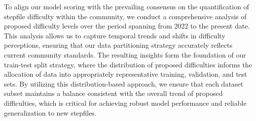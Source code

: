 \vspace{2mm}


To align our model scoring with the prevailing consensus on the quantification of stepfile difficulty within the community, we conduct a comprehensive analysis of proposed difficulty levels over the period spanning from 2022 to the present date. This analysis allows us to capture temporal trends and shifts in difficulty perceptions, ensuring that our data partitioning strategy accurately reflects current community standards. The resulting insights form the foundation of our train-test split strategy, where the distribution of proposed difficulties informs the allocation of data into appropriately representative training, validation, and test sets. By utilizing this distribution-based approach, we ensure that each dataset subset maintains a balance consistent with the overall trend of proposed difficulties, which is critical for achieving robust model performance and reliable generalization to new stepfiles.


\vspace{2mm}



